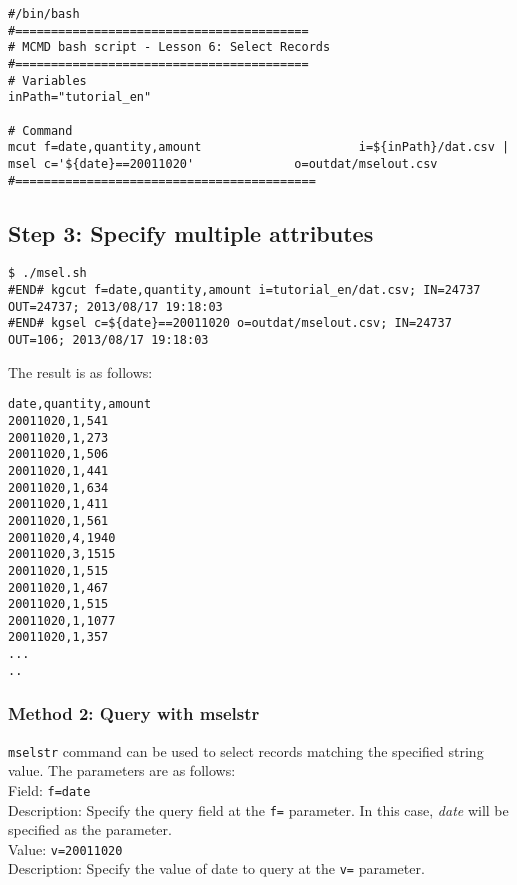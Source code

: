 \begin{verbatim}
#/bin/bash
#=========================================
# MCMD bash script - Lesson 6: Select Records 
#=========================================
# Variables
inPath="tutorial_en"

# Command 
mcut f=date,quantity,amount                      i=${inPath}/dat.csv |
msel c='${date}==20011020'   			o=outdat/mselout.csv
#==========================================
\end{verbatim}

\subsection{Step 3: Specify multiple attributes }

\begin{verbatim}
$ ./msel.sh 
#END# kgcut f=date,quantity,amount i=tutorial_en/dat.csv; IN=24737 OUT=24737; 2013/08/17 19:18:03
#END# kgsel c=${date}==20011020 o=outdat/mselout.csv; IN=24737 OUT=106; 2013/08/17 19:18:03
\end{verbatim}

\noindent
The result is as follows: 

\begin{verbatim}
date,quantity,amount
20011020,1,541
20011020,1,273
20011020,1,506
20011020,1,441
20011020,1,634
20011020,1,411
20011020,1,561
20011020,4,1940
20011020,3,1515
20011020,1,515
20011020,1,467
20011020,1,515
20011020,1,1077
20011020,1,357
...
..
\end{verbatim}

\subsubsection{Method 2: Query with mselstr }

{\setlength{\parindent}{0cm}

\verb|mselstr| command can be used to select records matching the specified string value. The parameters are as follows: \\

Field: 		\verb|f=date| \\
Description: 	Specify the query field at the \verb|f=| parameter. In this case, \emph{date} will be specified as the parameter. \\

Value: 		\verb|v=20011020| \\
Description: 	Specify the value of date to query at the \verb|v=| parameter. 

}

